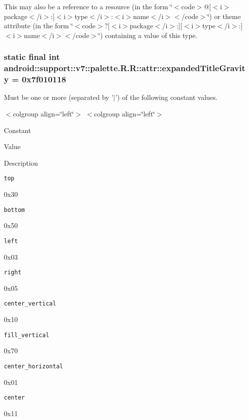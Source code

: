 This may also be a reference to a resource (in the form \char`\"{}$<$code$>$@\mbox{[}$<$i$>$package$<$/i$>$:\mbox{]}$<$i$>$type$<$/i$>$:$<$i$>$name$<$/i$>$$<$/code$>$\char`\"{}) or theme attribute (in the form \char`\"{}$<$code$>$?\mbox{[}$<$i$>$package$<$/i$>$:\mbox{]}\mbox{[}$<$i$>$type$<$/i$>$:\mbox{]}$<$i$>$name$<$/i$>$$<$/code$>$\char`\"{}) containing a value of this type. \hypertarget{classandroid_1_1support_1_1v7_1_1palette_1_1_r_1_1attr_5094a1a142140c090c9cf65b75c96fd1}{
\subsubsection[{expandedTitleGravity}]{\setlength{\rightskip}{0pt plus 5cm}static final int android::support::v7::palette.R.R::attr::expandedTitleGravity = 0x7f010118}}
\label{classandroid_1_1support_1_1v7_1_1palette_1_1_r_1_1attr_5094a1a142140c090c9cf65b75c96fd1}


Must be one or more (separated by '$|$') of the following constant values. \begin{TabularC}{0}
\hline
\end{TabularC}
$<$colgroup align=\char`\"{}left\char`\"{}$>$ $<$colgroup align=\char`\"{}left\char`\"{}$>$ 

Constant

Value

Description 

{\tt top}

0x30

{\tt bottom}

0x50

{\tt left}

0x03

{\tt right}

0x05

{\tt center\_\-vertical}

0x10

{\tt fill\_\-vertical}

0x70

{\tt center\_\-horizontal}

0x01

{\tt center}

0x11

